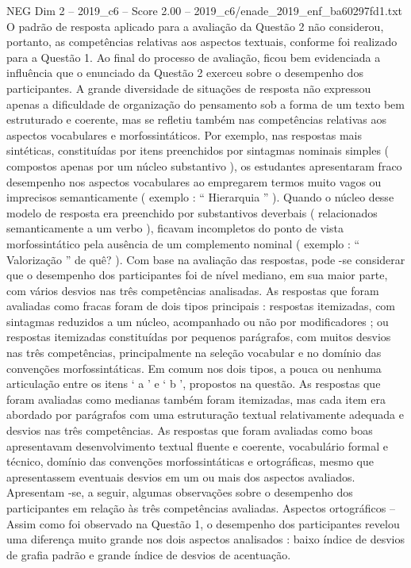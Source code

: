 \begin{textsample}{NEG Dim 2 – 2019\_c6 – Score 2.00 – 2019\_c6/enade\_2019\_enf\_ba60297fd1.txt}
O padrão de resposta aplicado para a avaliação da Questão 2 não considerou, portanto, as competências relativas aos aspectos textuais, conforme foi realizado para a Questão 1.
Ao final do processo de avaliação, ficou bem evidenciada a influência que o enunciado da Questão 2 exerceu sobre o desempenho dos participantes.
A grande diversidade de situações de resposta não expressou apenas a dificuldade de organização do pensamento sob a forma de um texto bem estruturado e coerente, mas se refletiu também nas competências relativas aos aspectos vocabulares e morfossintáticos.
Por exemplo, nas respostas mais sintéticas, constituídas por itens preenchidos por sintagmas nominais simples ( compostos apenas por um núcleo substantivo ), os estudantes apresentaram fraco desempenho nos aspectos vocabulares ao empregarem termos muito vagos ou imprecisos semanticamente ( exemplo : “ Hierarquia ” ).
Quando o núcleo desse modelo de resposta era preenchido por substantivos deverbais ( relacionados semanticamente a um verbo ), ficavam incompletos do ponto de vista morfossintático pela ausência de um complemento nominal ( exemplo : “ Valorização ” de quê? ).
Com base na avaliação das respostas, pode -se considerar que o desempenho dos participantes foi de nível mediano, em sua maior parte, com vários desvios nas três competências analisadas.
As respostas que foram avaliadas como fracas foram de dois tipos principais : respostas itemizadas, com sintagmas reduzidos a um núcleo, acompanhado ou não por modificadores ; ou respostas itemizadas constituídas por pequenos parágrafos, com muitos desvios nas três competências, principalmente na seleção vocabular e no domínio das convenções morfossintáticas.
Em comum nos dois tipos, a pouca ou nenhuma articulação entre os itens ‘ a ’ e ‘ b ’, propostos na questão.
As respostas que foram avaliadas como medianas também foram itemizadas, mas cada item era abordado por parágrafos com uma estruturação textual relativamente adequada e desvios nas três competências.
As respostas que foram avaliadas como boas apresentavam desenvolvimento textual fluente e coerente, vocabulário formal e técnico, domínio das convenções morfossintáticas e ortográficas, mesmo que apresentassem eventuais desvios em um ou mais dos aspectos avaliados.
Apresentam -se, a seguir, algumas observações sobre o desempenho dos participantes em relação às três competências avaliadas.
Aspectos ortográficos – Assim como foi observado na Questão 1, o desempenho dos participantes revelou uma diferença muito grande nos dois aspectos analisados : baixo índice de desvios de grafia padrão e grande índice de desvios de acentuação.

\end{textsample}
